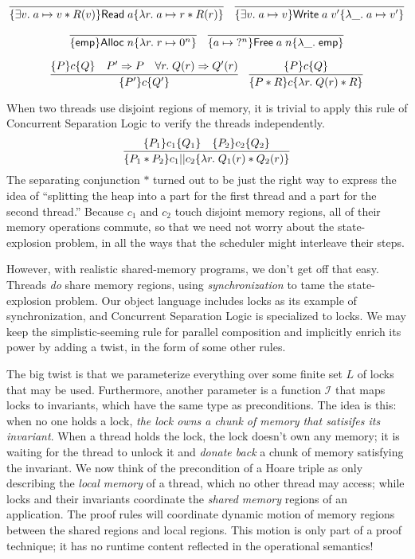 \documentclass{amsbook}
\theoremstyle{definition}
\theoremstyle{remark}
\numberwithin{section}{chapter}
\numberwithin{equation}{chapter}
\begin{document}
$$\infer{\hoare{\exists v. \; \ptsto{a}{v} * R(v)}{\mt{Read} \; a}{\lambda r. \; \ptsto{a}{r} * R(r)}}{}
\quad \infer{\hoare{\exists v. \; \ptsto{a}{v}}{\mt{Write} \; a \; v'}{\lambda \_. \; \ptsto{a}{v'}}}{}$$

$$\infer{\hoare{\emp}{\mt{Alloc} \; n}{\lambda r. \; \ptsto{r}{0^n}}}{}
\quad \infer{\hoare{\ptsto{a}{\; ?^n}}{\mt{Free} \; a \; n}{\lambda \_. \; \emp}}{}$$

$$\infer{\hoare{P'}{c}{Q'}}{
  \hoare{P}{c}{Q}
  & P' \Rightarrow P
  & \forall r. \; Q(r) \Rightarrow Q'(r)
}
\quad \infer{\hoare{P * R}{c}{\lambda r. \; Q(r) * R}}{
  \hoare{P}{c}{Q}
}$$

\modularity
When two threads use disjoint regions of memory, it is trivial to apply this rule of Concurrent Separation Logic to verify the threads independently.
$$\infer{\hoare{P_1 * P_2}{c_1 || c_2}{\lambda r. \; Q_1(r) * Q_2(r)}}{
  \hoare{P_1}{c_1}{Q_1}
  & \hoare{P_2}{c_2}{Q_2}
}$$
The separating conjunction $*$ turned out to be just the right way to express the idea of ``splitting the heap into a part for the first thread and a part for the second thread.''
Because $c_1$ and $c_2$ touch disjoint memory regions, all of their memory operations commute, so that we need not worry about the state-explosion problem, in all the ways that the scheduler might interleave their steps.

However, with realistic shared-memory programs, we don't get off that easy.
Threads \emph{do} share memory regions, using \emph{synchronization} to tame the state-explosion problem.
Our object language includes locks as its example of synchronization, and Concurrent Separation Logic is specialized to locks.
We may keep the simplistic-seeming rule for parallel composition and implicitly enrich its power by adding a twist, in the form of some other rules.

The big twist is that we parameterize everything over some finite set $L$ of locks that may be used.
\invariants
Furthermore, another parameter is a function $\mathcal I$ that maps locks to invariants, which have the same type as preconditions.
The idea is this: when no one holds a lock, \emph{the lock owns a chunk of memory that satisifes its invariant}.
When a thread holds the lock, the lock doesn't own any memory; it is waiting for the thread to unlock it and \emph{donate back} a chunk of memory satisfying the invariant.
We now think of the precondition of a Hoare triple as only describing the \emph{local memory} of a thread, which no other thread may access; while locks and their invariants coordinate the \emph{shared memory} regions of an application.
The proof rules will coordinate dynamic motion of memory regions between the shared regions and local regions.
This motion is only part of a proof technique; it has no runtime content reflected in the operational semantics!
\end{document}
